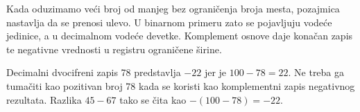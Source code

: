 Kada oduzimamo veći broj od manjeg bez ograničenja broja mesta, pozajmica nastavlja da se prenosi ulevo. U binarnom primeru zato se pojavljuju vodeće jedinice, a u decimalnom vodeće devetke. Komplement osnove daje konačan zapis te negativne vrednosti u registru ograničene širine.

Decimalni dvocifreni zapis 78 predstavlja $-22$ jer je $100-78=22$. Ne treba ga tumačiti kao pozitivan broj 78 kada se koristi kao komplementni zapis negativnog rezultata. Razlika $45-67$ tako se čita kao $-(100-78)=-22$.
